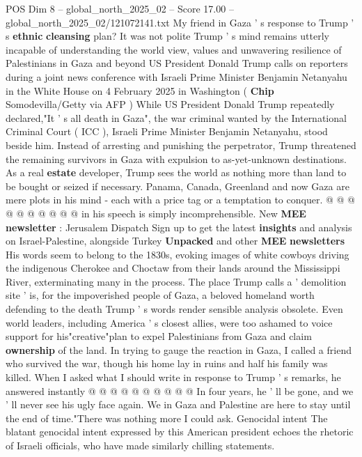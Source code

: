 \begin{textsample}{POS Dim 8 – global\_north\_2025\_02 – Score 17.00 – global\_north\_2025\_02/121072141.txt}  \label{ex:f8_pos_001}
My friend in Gaza ' s response to Trump ' s \textbf{ethnic} \textbf{cleansing} plan?
It was not polite Trump ' s mind remains utterly incapable of understanding the world view, values and unwavering resilience of Palestinians in Gaza and beyond US President Donald Trump calls on reporters during a joint news conference with Israeli Prime Minister Benjamin Netanyahu in the White House on 4 February 2025 in Washington ( \textbf{Chip} Somodevilla/Getty via AFP ) While US President Donald Trump repeatedly declared,"It ' s all death in Gaza", the war criminal wanted by the International Criminal Court ( ICC ), Israeli Prime Minister Benjamin Netanyahu, stood beside him.
Instead of arresting and punishing the perpetrator, Trump threatened the remaining survivors in Gaza with expulsion to as-yet-unknown destinations.
As a real \textbf{estate} developer, Trump sees the world as nothing more than land to be bought or seized if necessary.
Panama, Canada, Greenland and now Gaza are mere plots in his mind - each with a price tag or a temptation to conquer. @ @ @ @ @ @ @ @ @ @ in his speech is simply incomprehensible.
New \textbf{MEE} \textbf{newsletter} : Jerusalem Dispatch Sign up to get the latest \textbf{insights} and analysis on Israel-Palestine, alongside Turkey \textbf{Unpacked} and other \textbf{MEE} \textbf{newsletters} His words seem to belong to the 1830s, evoking images of white cowboys driving the indigenous Cherokee and Choctaw from their lands around the Mississippi River, exterminating many in the process.
The place Trump calls a ' demolition site ' is, for the impoverished people of Gaza, a beloved homeland worth defending to the death Trump ' s words render sensible analysis obsolete.
Even world leaders, including America ' s closest allies, were too ashamed to voice support for his"creative"plan to expel Palestinians from Gaza and claim \textbf{ownership} of the land.
In trying to gauge the reaction in Gaza, I called a friend who survived the war, though his home lay in ruins and half his family was killed.
When I asked what I should write in response to Trump ' s remarks, he answered instantly @ @ @ @ @ @ @ @ @ @ In four years, he ' ll be gone, and we ' ll never see his ugly face again.
We in Gaza and Palestine are here to stay until the end of time."There was nothing more I could ask.
Genocidal intent The blatant genocidal intent expressed by this American president echoes the rhetoric of Israeli officials, who have made similarly chilling statements.

\end{textsample}
